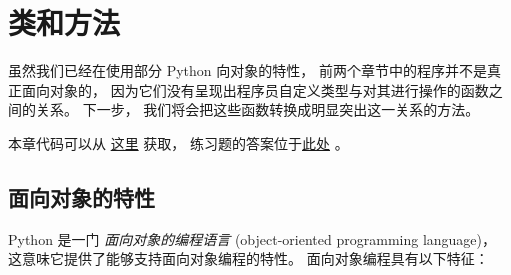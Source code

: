 

\chapter{类和方法}


虽然我们已经在使用部分 Python 向对象的特性，
前两个章节中的程序并不是真正面向对象的，
因为它们没有呈现出程序员自定义类型与对其进行操作的函数之间的关系。
下一步， 我们将会把这些函数转换成明显突出这一关系的方法。



本章代码可以从 \href{http://thinkpython2.com/code/Time2.py}{这里} 获取，
练习题的答案位于\href{http://thinkpython2.com/code/Point2_soln.py}{此处} 。


\section{面向对象的特性}
  


Python 是一门 {\em 面向对象的编程语言} (object-oriented programming language)，
这意味它提供了能够支持面向对象编程的特性。
面向对象编程具有以下特征：


